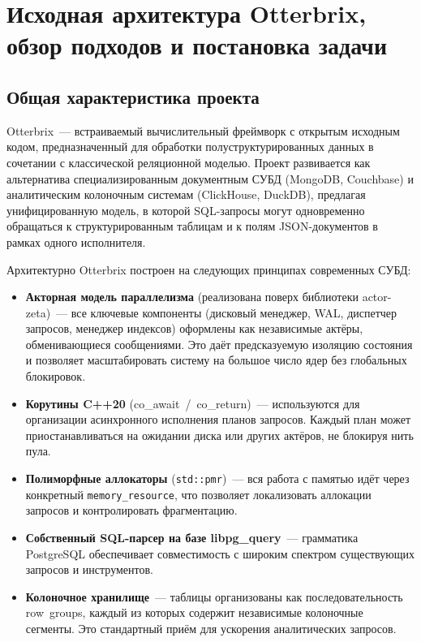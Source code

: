 \chapter{Исходная архитектура Otterbrix, обзор подходов и постановка задачи}

\section{Общая характеристика проекта}

Otterbrix~--- встраиваемый вычислительный фреймворк с открытым
исходным кодом, предназначенный для обработки полуструктурированных
данных в сочетании с классической реляционной моделью. Проект
развивается как альтернатива специализированным документным СУБД
(MongoDB, Couchbase) и аналитическим колоночным системам
(ClickHouse, DuckDB), предлагая унифицированную модель, в которой
SQL-запросы могут одновременно обращаться к структурированным
таблицам и к полям JSON-документов в рамках одного исполнителя.

Архитектурно Otterbrix построен на следующих принципах современных
СУБД:
\begin{itemize}
    \item \textbf{Акторная модель параллелизма} (реализована поверх
    библиотеки actor-zeta)~--- все ключевые компоненты (дисковый
    менеджер, WAL, диспетчер запросов, менеджер индексов)
    оформлены как независимые актёры, обменивающиеся сообщениями.
    Это даёт предсказуемую изоляцию состояния и позволяет
    масштабировать систему на большое число ядер без глобальных
    блокировок.
    \item \textbf{Корутины C++20} (co\_await~/~co\_return)~---
    используются для организации асинхронного исполнения планов
    запросов. Каждый план может приостанавливаться на ожидании
    диска или других актёров, не блокируя нить пула.
    \item \textbf{Полиморфные аллокаторы} (\texttt{std::pmr})~---
    вся работа с памятью идёт через конкретный
    \texttt{memory\_resource}, что позволяет локализовать
    аллокации запросов и контролировать фрагментацию.
    \item \textbf{Собственный SQL-парсер на базе
    libpg\_query}~--- грамматика PostgreSQL обеспечивает
    совместимость с широким спектром существующих запросов и
    инструментов.
    \item \textbf{Колоночное хранилище}~--- таблицы организованы
    как последовательность row~groups, каждый из которых содержит
    независимые колоночные сегменты. Это стандартный приём для
    ускорения аналитических запросов.
\end{itemize}

